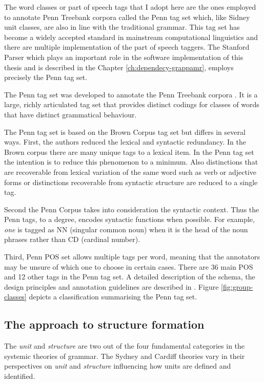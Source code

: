 
The word classes or part of speech tags that I adopt here are the ones employed to annotate Penn Treebank corpora called the Penn tag set \citep{Marcus1993} which, like Sidney unit classes, are also in line with the traditional grammar. This tag set has become a widely accepted standard in mainstream computational linguistics and there are multiple implementation of the part of speech taggers. The Stanford Parser which plays an important role in the software implementation of this thesis and is described in the Chapter \ref{ch:dependecy-grappamr}, employs precisely the Penn tag set.

The Penn tag set was developed to annotate the Penn Treebank corpora \citep{Marcus1993}. It is a large, richly articulated tag set that provides distinct codings for classes of words that have distinct grammatical behaviour.

The Penn tag set is based on the Brown Corpus tag set \citep{Kucera1968} but differs in several ways. First, the authors reduced the lexical and syntactic redundancy. In the Brown corpus there are many unique tags to a lexical item. In the Penn tag set the intention is to reduce this phenomenon to a minimum. Also distinctions that are recoverable from lexical variation of the same word such as verb or adjective forms or distinctions recoverable from syntactic structure are reduced to a single tag. 

Second the Penn Corpus takes into consideration the syntactic context. Thus the Penn tags, to a degree, encodes syntactic functions when possible. For example, \textit{one} is tagged as NN (singular common noun) when it is the head of the noun phrases rather than CD (cardinal number). 

Third, Penn POS set allows multiple tags per word, meaning that the annotators may be unsure of which one to choose in certain cases. There are 36 main POS and 12 other tags in the Penn tag set. A detailed description of the schema, the design principles and annotation guidelines are described in \citep{Santorini1990}. Figure \ref{fig:group-classes} depicts a classification summarising the Penn tag set. 

\subsection{The approach to structure formation}
The \textit{unit} and \textit{structure} are two out of the four fundamental categories in the systemic theories of grammar. The Sydney and Cardiff theories vary in their perspectives on \textit{unit} and \textit{structure} influencing how units are defined and identified.

